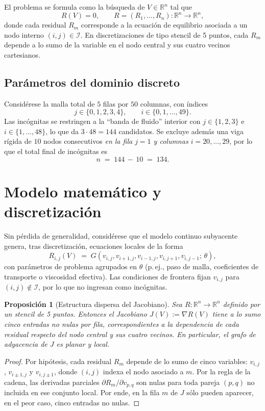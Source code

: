 \documentclass[12pt,letterpaper]{article}
\newtheorem{proposition}{Proposición}
\theoremstyle{definition}
\theoremstyle{remark}
\newcommand{\R}{\mathbb{R}}
\begin{document}
El problema se formula como la búsqueda de $V\in\R^{n}$ tal que
\begin{equation}
  R(V) = 0,\qquad R=(R_1,\dots,R_n):\R^n\to\R^n,
\end{equation}
donde cada residual $R_m$ corresponde a la ecuación de equilibrio asociada a un nodo interno $(i,j)\in\mathcal{I}$. En discretizaciones de tipo stencil de 5 puntos, cada $R_m$ depende a lo sumo de la variable en el nodo central y sus cuatro vecinos cartesianos.

\subsection*{Parámetros del dominio discreto}
Considérese la malla total de $5$ filas por $50$ columnas, con índices
\[
  j\in\{0,1,2,3,4\}, \qquad i\in\{0,1,\dots,49\}.
\]
Las incógnitas se restringen a la ``banda de fluido'' interior con $j\in\{1,2,3\}$ e $i\in\{1,\dots,48\}$, lo que da $3\cdot 48=144$ candidatos. Se excluye además una viga rígida de $10$ nodos consecutivos \emph{en la fila $j=1$ y columnas $i=20,\dots,29$}, por lo que el total final de incógnitas es
\[
  n\;=\;144\, -\,10\;=\;134.
\]

\section{Modelo matemático y discretización}
Sin pérdida de generalidad, considérese que el modelo continuo subyacente genera, tras discretización, ecuaciones locales de la forma
\begin{equation}
  R_{i,j}(V)\;=\;G\!\left(v_{i,j},v_{i+1,j},v_{i-1,j},v_{i,j+1},v_{i,j-1};\,\theta\right),
\end{equation}
con parámetros de problema agrupados en $\theta$ (p.\,ej., paso de malla, coeficientes de transporte o viscosidad efectiva). Las condiciones de frontera fijan $v_{i,j}$ para $(i,j)\notin\mathcal{I}$, por lo que no ingresan como incógnitas.

\begin{proposition}[Estructura dispersa del Jacobiano]
Sea $R:\R^n\to\R^n$ definido por un stencil de 5 puntos. Entonces el Jacobiano $J(V):=\nabla R(V)$ tiene a lo sumo cinco entradas no nulas por fila, correspondientes a la dependencia de cada residual respecto del nodo central y sus cuatro vecinos. En particular, el grafo de adyacencia de $J$ es planar y local.
\end{proposition}
\begin{proof}
Por hipótesis, cada residual $R_m$ depende de lo sumo de cinco variables: $v_{i,j}$, $v_{i\pm1,j}$ y $v_{i,j\pm1}$, donde $(i,j)$ indexa el nodo asociado a $m$. Por la regla de la cadena, las derivadas parciales $\partial R_m/\partial v_{p,q}$ son nulas para toda pareja $(p,q)$ no incluida en ese conjunto local. Por ende, en la fila $m$ de $J$ sólo pueden aparecer, en el peor caso, cinco entradas no nulas. \qedhere
\end{proof}
\end{document}
